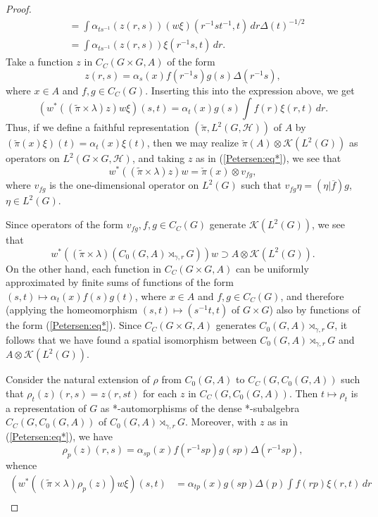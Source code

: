 \documentclass{book}
\begin{document}
\begin{proof}
\begin{align*}
    &=\int\alpha_{t s^{-1}}(z(r,s))(w\xi)(r^{-1}s t^{-1},t)\,dr{\Delta(t)}^{-1/2}\\
    &=\int\alpha_{t s^{-1}}(z(r,s))\xi(r^{-1}s,t)\,dr.
  \end{align*}
  Take a function \(z\) in \(C_C(G\times G, A)\) of the form
  \begin{equation}\label{Petersen:eq*}
    z(r,s)=\alpha_s(x)f(r^{-1}s)g(s)\Delta(r^{-1}s),
  \end{equation}
  where \(x\in A\) and \(f,g\in C_C(G)\). Inserting this into the expression above, we get
  \[
    (w^*((\tilde{\pi}\times\lambda)z)w\xi)(s,t)=\alpha_t(x)g(s)\int f(r)\xi(r,t)\,dr.
  \]
  Thus, if we define a faithful representation \((\check{\pi}, L^2(G, \mathcal{H}))\) of \(A\) by
  \((\check{\pi}(x)\xi)(t)=\alpha_t(x)\xi(t)\), then we may realize \(\check{\pi}(A)\otimes\mathcal{K}(L^2(G))\) as operators on 
  \(L^2(G\times G, \mathcal{H})\), and taking \(z\) as in (\ref{Petersen:eq*}), we see that
  \[
    w^*((\tilde{\pi}\times\lambda)z)w=\check{\pi}(x)\otimes v_{fg},
  \]
  where \(v_{fg}\) is the one-dimensional operator on \(L^2(G)\) such that \(v_{fg}\eta=(\eta|\overline{f})g\), \(\eta\in L^2(G)\).\par
  Since operators of the form \(v_{fg}, f,g\in C_C(G)\) generate \(\mathcal{K}(L^2(G))\), we see that
  \[
    w^*((\tilde{\pi}\times\lambda)(C_0(G,A)\rtimes_{\gamma,r}G))w\supset A\otimes\mathcal{K}(L^2(G)).
  \]
  On the other hand, each function in \(C_C(G\times G, A)\) can be uniformly approximated by finite sums of functions of the form 
  \((s,t)\mapsto \alpha_t(x)f(s)g(t)\), where \(x\in A\) and \(f,g\in C_C(G)\), and therefore (applying the homeomorphism \((s,t)\mapsto (s^{-1}t,t)\) of \(G\times G\)) also by functions of
  the form (\ref{Petersen:eq*}). Since \(C_C(G\times G, A)\) generates \(C_0(G,A)\rtimes_{\gamma,r}G\), it follows that we have found a spatial isomorphism between
  \(C_0(G,A)\rtimes_{\gamma,r}G\) and \(A\otimes\mathcal{K}(L^2(G))\).\par
  Consider the natural extension of \(\rho\) from \(C_0(G,A)\) to \(C_C(G,C_0(G,A))\) such that
  \(\rho_t(z)(r,s)=z(r,st)\) for each \(z\) in \(C_C(G,C_0(G,A))\). Then \(t\mapsto\rho_t\) is a representation
  of \(G\) as *-automorphisms of the dense *-subalgebra \(C_C(G,C_0(G,A))\)
  of \(C_0(G,A)\rtimes_{\gamma,r}G\). Moreover, with \(z\) as in (\ref{Petersen:eq*}), we have
  \[
    \rho_p(z)(r,s)=\alpha_{sp}(x)f(r^{-1}sp)g(sp)\Delta(r^{-1}sp),
  \]
  whence
  \begin{align*}
    (w^*((\tilde{\pi}\times\lambda)\rho_p(z))w\xi)(s,t)&=\alpha_{tp}(x)g(sp)\Delta(p)\int f(rp)\xi(r,t)\,dr\\

\end{align*}
\end{proof}
\end{document}
